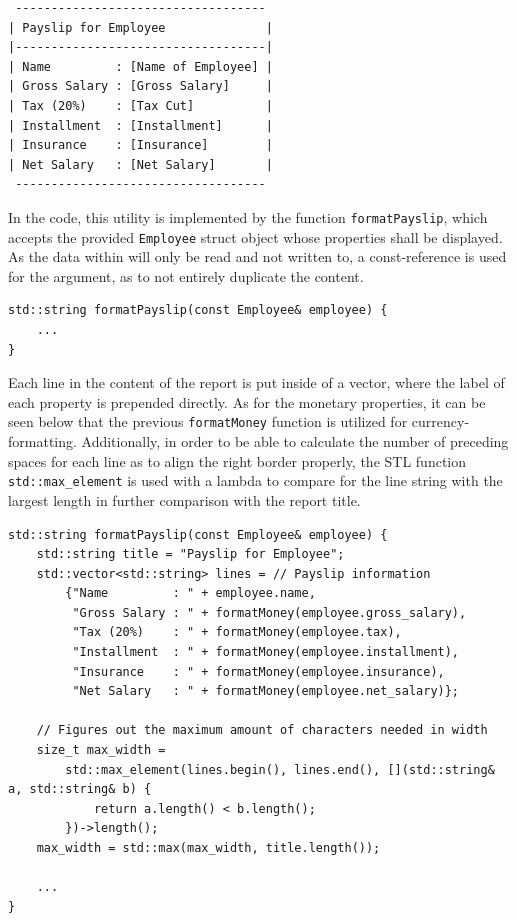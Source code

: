 \documentclass[12pt]{article}
\begin{document}
\begin{verbatim}
 -----------------------------------
| Payslip for Employee              |
|-----------------------------------|
| Name         : [Name of Employee] |
| Gross Salary : [Gross Salary]     |
| Tax (20%)    : [Tax Cut]          |
| Installment  : [Installment]      |
| Insurance    : [Insurance]        |
| Net Salary   : [Net Salary]       |
 -----------------------------------
\end{verbatim}

In the code, this utility is implemented by the function \texttt{formatPayslip}, which accepts the provided \texttt{Employee} struct object whose properties shall be displayed. As the data within will only be read and not written to, a const-reference is used for the argument, as to not entirely duplicate the content.

\begin{verbatim}
std::string formatPayslip(const Employee& employee) {
    ...
}
\end{verbatim}

Each line in the content of the report is put inside of a vector, where the label of each property is prepended directly. As for the monetary properties, it can be seen below that the previous \texttt{formatMoney} function is utilized for currency-formatting. Additionally, in order to be able to calculate the number of preceding spaces for each line as to align the right border properly, the STL function \texttt{std::max\_element} is used with a lambda to compare for the line string with the largest length in further comparison with the report title.

\begin{verbatim}
std::string formatPayslip(const Employee& employee) {
    std::string title = "Payslip for Employee";
    std::vector<std::string> lines = // Payslip information
        {"Name         : " + employee.name,
         "Gross Salary : " + formatMoney(employee.gross_salary),
         "Tax (20%)    : " + formatMoney(employee.tax),
         "Installment  : " + formatMoney(employee.installment),
         "Insurance    : " + formatMoney(employee.insurance),
         "Net Salary   : " + formatMoney(employee.net_salary)};

    // Figures out the maximum amount of characters needed in width
    size_t max_width =
        std::max_element(lines.begin(), lines.end(), [](std::string& a, std::string& b) {
            return a.length() < b.length();
        })->length();
    max_width = std::max(max_width, title.length());

    ...
}
\end{verbatim}
\end{document}
